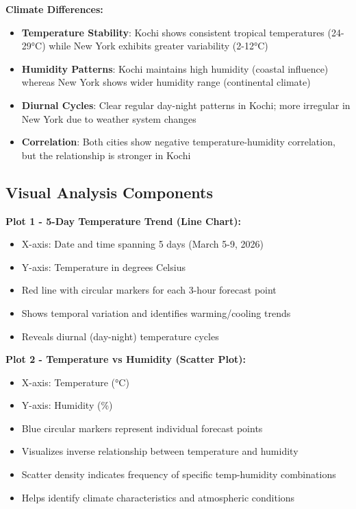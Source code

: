 \documentclass[a4paper]{article}
\begin{document}
\textbf{Climate Differences:}
\begin{itemize}
    \item \textbf{Temperature Stability}: Kochi shows consistent tropical temperatures (24-29°C) while New York exhibits greater variability (2-12°C)
    \item \textbf{Humidity Patterns}: Kochi maintains high humidity (coastal influence) whereas New York shows wider humidity range (continental climate)
    \item \textbf{Diurnal Cycles}: Clear regular day-night patterns in Kochi; more irregular in New York due to weather system changes
    \item \textbf{Correlation}: Both cities show negative temperature-humidity correlation, but the relationship is stronger in Kochi
\end{itemize}

\vspace{5pt}

\subsection*{Visual Analysis Components}

\textbf{  Plot 1 - 5-Day Temperature Trend (Line Chart):}
\begin{itemize}
    \item X-axis: Date and time spanning 5 days (March 5-9, 2026)
    \item Y-axis: Temperature in degrees Celsius
    \item Red line with circular markers for each 3-hour forecast point
    \item Shows temporal variation and identifies warming/cooling trends
    \item Reveals diurnal (day-night) temperature cycles
\end{itemize}

\textbf{Plot 2 - Temperature vs Humidity (Scatter Plot):}
\begin{itemize}
    \item X-axis: Temperature (°C)
    \item Y-axis: Humidity (\%)
    \item Blue circular markers represent individual forecast points
    \item Visualizes inverse relationship between temperature and humidity
    \item Scatter density indicates frequency of specific temp-humidity combinations
    \item Helps identify climate characteristics and atmospheric conditions
\end{itemize}
\end{document}
